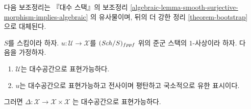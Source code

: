 \noindent
다음 보조정리는 『대수 스택』의 보조정리
\ref{algebraic-lemma-smooth-surjective-morphism-implies-algebraic}
의 유사물이며, 뒤의 더 강한 정리 \ref{theorem-bootstrap}으로 대체된다.

\begin{lemma}
\label{lemma-flat-finite-presentation-surjective-diagonal}
$S$를 스킴이라 하자.
$u : \mathcal{U} \to \mathcal{X}$를 $(\mathit{Sch}/S)_{fppf}$ 위의
준군 스택의 $1$-사상이라 하자. 다음을 가정하자.
\begin{enumerate}
\item $\mathcal{U}$는 대수공간으로 표현가능하다.
\item $u$는 대수공간으로 표현가능하고 전사이며 평탄하고
국소적으로 유한 표시이다.
\end{enumerate}
그러면
$\Delta : \mathcal{X} \to \mathcal{X} \times \mathcal{X}$
는 대수공간으로 표현가능하다.
\end{lemma}

